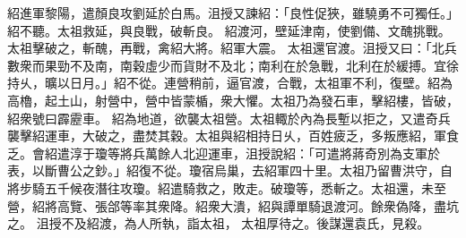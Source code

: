 \begin{pinyinscope}
 
紹進軍黎陽，遣顏良攻劉延於白馬。沮授又諫紹：「良性促狹，雖驍勇不可獨任。」紹不聽。太祖救延，與良戰，破斬良。
 紹渡河，壁延津南，使劉備、文醜挑戰。太祖擊破之，斬醜，再戰，禽紹大將。紹軍大震。
 太祖還官渡。沮授又曰：「北兵數衆而果勁不及南，南穀虛少而貨財不及北；南利在於急戰，北利在於緩搏。宜徐持乆，曠以日月。」紹不從。連營稍前，逼官渡，合戰，太祖軍不利，復壁。紹為高櫓，起土山，射營中，營中皆蒙楯，衆大懼。太祖乃為發石車，擊紹樓，皆破，紹衆號曰霹靂車。
 紹為地道，欲襲太祖營。太祖輙於內為長塹以拒之，又遣奇兵襲擊紹運車，大破之，盡焚其穀。太祖與紹相持日乆，百姓疲乏，多叛應紹，軍食乏。會紹遣淳于瓊等將兵萬餘人北迎運車，沮授說紹：「可遣將蔣奇別為支軍於表，以斷曹公之鈔。」紹復不從。瓊宿烏巢，去紹軍四十里。太祖乃留曹洪守，自將步騎五千候夜潛往攻瓊。紹遣騎救之，敗走。破瓊等，悉斬之。太祖還，未至營，紹將高覽、張郃等率其衆降。紹衆大潰，紹與譚單騎退渡河。餘衆偽降，盡坑之。
 沮授不及紹渡，為人所執，詣太祖，
 太祖厚待之。後謀還袁氏，見殺。
 

\end{pinyinscope}
